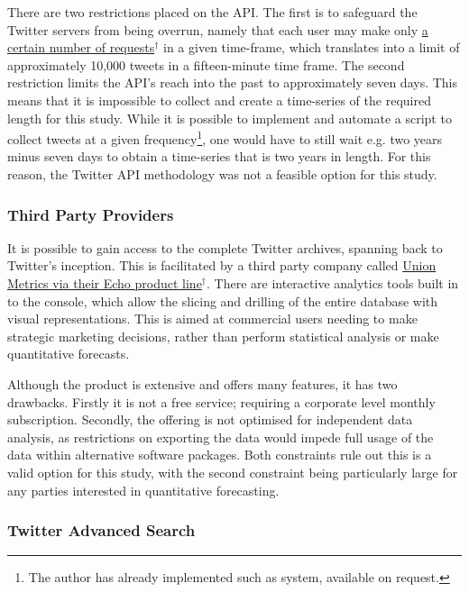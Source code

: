 \documentclass{article}
\begin{document}
There are two restrictions placed on the API. The first is to safeguard the Twitter servers from being overrun, namely that each user may make only \href{https://dev.twitter.com/rest/public/rate-limits}{a certain number of requests$^{\dag{}}$} in a given time-frame, which translates into a limit of approximately 10,000 tweets in a fifteen-minute time frame. The second restriction limits the API's reach into the past to approximately seven days. This means that it is impossible to collect and create a time-series of the required length for this study. While it is possible to implement and automate a script to collect tweets at a given frequency\footnote{The author has already implemented such as system, available on request.}, one would have to still wait e.g. two years minus seven days to obtain a time-series that is two years in length. For this reason, the Twitter API methodology was not a feasible option for this study.


\subsubsection{Third Party Providers}
\label{sec-2-3-2}
It is possible to gain access to the complete Twitter archives, spanning back to Twitter's inception. This is facilitated by a third party company called \href{https://unionmetrics.com/product/echo-twitter-archive-search/}{Union Metrics via their Echo product line$^{\dag{}}$}. There are interactive analytics tools built in to the console, which allow the slicing and drilling of the entire database with visual representations. This is aimed at commercial users needing to make strategic marketing decisions, rather than perform statistical analysis or make quantitative forecasts.

Although the product is extensive and offers many features, it has two drawbacks. Firstly it is not a free service; requiring a corporate level monthly subscription. Secondly, the offering is not optimised for independent data analysis, as restrictions on exporting the data would impede full usage of the data within alternative software packages. Both constraints rule out this is a valid option for this study, with the second constraint being particularly large for any parties interested in quantitative forecasting.


\subsubsection{Twitter Advanced Search}
\label{sec-2-3-3}
\end{document}
